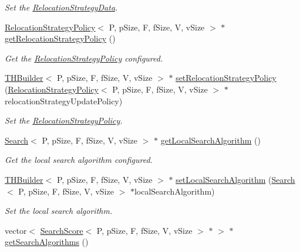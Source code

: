 \begin{DoxyCompactItemize}
\begin{DoxyCompactList}\small\item\em Set the \hyperlink{structRelocationStrategyData}{Relocation\+Strategy\+Data}. \end{DoxyCompactList}\item 
\hyperlink{classRelocationStrategyPolicy}{Relocation\+Strategy\+Policy}$<$ P, p\+Size, F, f\+Size, V, v\+Size $>$ $\ast$ \hyperlink{classTHBuilder_a080cdf2aea549d1074186156aa449b62}{get\+Relocation\+Strategy\+Policy} ()
\begin{DoxyCompactList}\small\item\em Get the \hyperlink{classRelocationStrategyPolicy}{Relocation\+Strategy\+Policy} configured. \end{DoxyCompactList}\item 
\hyperlink{classTHBuilder}{T\+H\+Builder}$<$ P, p\+Size, F, f\+Size, V, v\+Size $>$ $\ast$ \hyperlink{classTHBuilder_ab5e07bd198dd27f690145323bc6c06b3}{set\+Relocation\+Strategy\+Policy} (\hyperlink{classRelocationStrategyPolicy}{Relocation\+Strategy\+Policy}$<$ P, p\+Size, F, f\+Size, V, v\+Size $>$ $\ast$relocation\+Strategy\+Update\+Policy)
\begin{DoxyCompactList}\small\item\em Set the \hyperlink{classRelocationStrategyPolicy}{Relocation\+Strategy\+Policy}. \end{DoxyCompactList}\item 
\hyperlink{classSearch}{Search}$<$ P, p\+Size, F, f\+Size, V, v\+Size $>$ $\ast$ \hyperlink{classTHBuilder_a6e0fe39ec073e41f1ff16f0a842787a7}{get\+Local\+Search\+Algorithm} ()
\begin{DoxyCompactList}\small\item\em Get the local search algorithm configured. \end{DoxyCompactList}\item 
\hyperlink{classTHBuilder}{T\+H\+Builder}$<$ P, p\+Size, F, f\+Size, V, v\+Size $>$ $\ast$ \hyperlink{classTHBuilder_a4827ba95c2880340d8460db7779157d1}{set\+Local\+Search\+Algorithm} (\hyperlink{classSearch}{Search}$<$ P, p\+Size, F, f\+Size, V, v\+Size $>$ $\ast$local\+Search\+Algorithm)
\begin{DoxyCompactList}\small\item\em Set the local search algorithm. \end{DoxyCompactList}\item 
vector$<$ \hyperlink{classSearchScore}{Search\+Score}$<$ P, p\+Size, F, f\+Size, V, v\+Size $>$ $\ast$ $>$ $\ast$ \hyperlink{classTHBuilder_a965c2231b9dd21a606a5de11d4682a33}{get\+Search\+Algorithms} ()

\end{DoxyCompactItemize}
